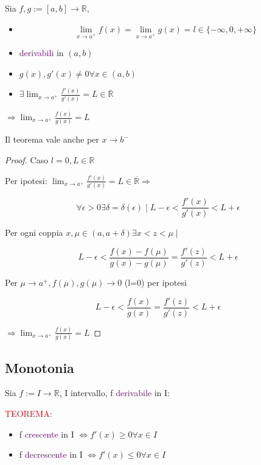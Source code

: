 \documentclass{article}
\begin{document}
\begin{tcolorbox}[colback= red!15!yellow!5!white, colframe=red]

Sia $f,g:= [a,b] \to \mathbb{R} $, 
\begin{itemize}
\item \[ \lim_{x \to a^+} f(x)= \lim_{x \to a^+} g(x)= l \in \{- \infty, 0, + \infty\}\]
    \item \textcolor{purple}{derivabili} in $(a,b)$
    \item $g(x), g'(x) \neq 0 \forall x \in (a, b) $
    \item $\exists \lim_{x \to a^+}\frac{f'(x)}{g'(x)}= L \in \overline{\mathbb{R}}$
\end{itemize}
$\Rightarrow  \lim_{x \to a^+}\frac{f(x)}{g(x)}= L$




\end{tcolorbox}

Il teorema vale anche per $x \to b^-$

\begin{proof}

Caso $l=0, L\in \mathbb{R}$ 

Per ipotesi: $\lim_{x \to a^+}\frac{f'(x)}{g'(x)}= L \in \overline{\mathbb{R}} \Rightarrow$

\[\forall \epsilon>0 \exists \delta=\delta(\epsilon) \mid L- \epsilon < \frac{f'(x)}{g'(x)} < L + \epsilon \]

Per ogni coppia $x, \mu \in (a, a + \delta) \exists x<z<\mu \mid $

\[ L- \epsilon < \frac{f(x)-f(\mu)}{g(x) - g(\mu)}=\frac{f'(z)}{g'(z)} < L + \epsilon \]

Per $\mu \to a^+, f(\mu), g(\mu) \to 0$ (l=0) per ipotesi

\[ L- \epsilon < \frac{f(x)}{g(x)}=\frac{f'(z)}{g'(z)} < L + \epsilon \]

$\Rightarrow  \lim_{x \to a^+}\frac{f(x)}{g(x)}= L$


\end{proof}



\subsection{Monotonia}

Sia $f:= I \to \mathbb{R} $, I intervallo, f \textcolor{purple}{derivabile} in I: 

  \begin{tcolorbox}[colback= red!15!yellow!5!white, colframe=red]
  \textcolor{red}{TEOREMA: }


\begin{itemize}
    \item f \textcolor{purple}{crescente} in I $\Leftrightarrow f'(x) \ge 0 \forall x \in I$
    \item f \textcolor{purple}{decrescente} in I $\Leftrightarrow f'(x) \le 0 \forall x \in I$
    
\end{itemize}

\end{tcolorbox}
\end{document}
